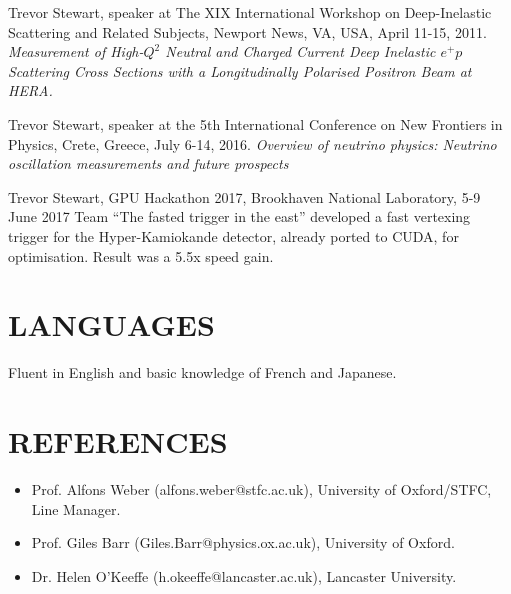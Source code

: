 \documentclass[margin]{res}
\begin{document}
\begin{resume}
Trevor Stewart, speaker at The XIX International Workshop on Deep-Inelastic Scattering and Related Subjects, Newport News, VA, USA, April 11-15, 2011. \textit{Measurement of High-$Q^2$ Neutral and Charged Current Deep Inelastic $e^+p$ Scattering Cross Sections with a Longitudinally Polarised Positron Beam at HERA.}

Trevor Stewart, speaker at the 5th International Conference on New Frontiers in Physics, Crete, Greece, July 6-14, 2016. \textit{Overview of neutrino physics: Neutrino oscillation measurements and future prospects}

Trevor Stewart, GPU Hackathon 2017, Brookhaven National Laboratory, 5-9 June 2017
Team ``The fasted trigger in the east'' developed a fast vertexing trigger for the Hyper-Kamiokande detector, already ported to CUDA, for optimisation. Result was a 5.5x speed gain. 
\section{LANGUAGES}
Fluent in English and basic knowledge of French and Japanese.

\section{REFERENCES}
\begin{itemize}
  \item Prof. Alfons Weber (alfons.weber@stfc.ac.uk), University of Oxford/STFC,\\ Line Manager. 
  \item Prof. Giles Barr (Giles.Barr@physics.ox.ac.uk), University of Oxford.
  \item Dr. Helen O'Keeffe (h.okeeffe@lancaster.ac.uk), Lancaster University.
\end{itemize}
\end{resume} 
\end{document}
